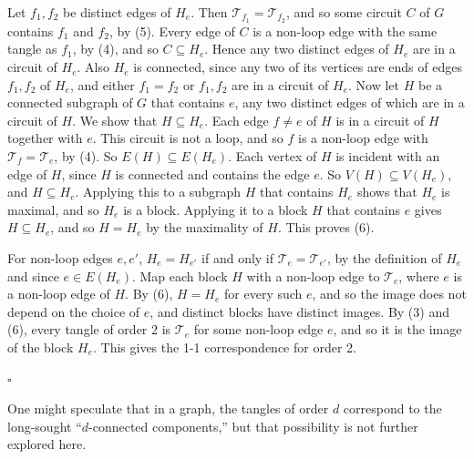 {Let $f_1, f_2$ be distinct edges of $H_e$. Then $\mathscr{T}_{f_1} = \mathscr{T}_{f_2}$, and so some circuit $C$ of $G$ contains $f_1$ and $f_2$, by (5). Every edge of $C$ is a non-loop edge with the same tangle as $f_1$, by (4), and so $C \subseteq H_e$. Hence any two distinct edges of $H_e$ are in a circuit of $H_e$. Also $H_e$ is connected, since any two of its vertices are ends of edges $f_1, f_2$ of $H_e$, and either $f_1 = f_2$ or $f_1, f_2$ are in a circuit of $H_e$. Now let $H$ be a connected subgraph of $G$ that contains $e$, any two distinct edges of which are in a circuit of $H$. We show that $H \subseteq H_e$. Each edge $f \ne e$ of $H$ is in a circuit of $H$ together with $e$. This circuit is not a loop, and so $f$ is a non-loop edge with $\mathscr{T}_f = \mathscr{T}_e$, by (4). So $E(H) \subseteq E(H_e)$. Each vertex of $H$ is incident with an edge of $H$, since $H$ is connected and contains the edge $e$. So $V(H) \subseteq V(H_e)$, and $H \subseteq H_e$. Applying this to a subgraph $H$ that contains $H_e$ shows that $H_e$ is maximal, and so $H_e$ is a block. Applying it to a block $H$ that contains $e$ gives $H \subseteq H_e$, and so $H = H_e$ by the maximality of $H$. This proves (6).

For non-loop edges $e, e'$, $H_e = H_{e'}$ if and only if $\mathscr{T}_e = \mathscr{T}_{e'}$, by the definition of $H_e$ and since $e \in E(H_e)$. Map each block $H$ with a non-loop edge to $\mathscr{T}_e$, where $e$ is a non-loop edge of $H$. By (6), $H = H_e$ for every such $e$, and so the image does not depend on the choice of $e$, and distinct blocks have distinct images. By (3) and (6), every tangle of order 2 is $\mathscr{T}_e$ for some non-loop edge $e$, and so it is the image of the block $H_e$. This gives the 1-1 correspondence for order 2.} $\square$

One might speculate that in a graph, the tangles of order $d$ correspond to the long-sought ``$d$-connected components,'' but that possibility is not further explored here.
